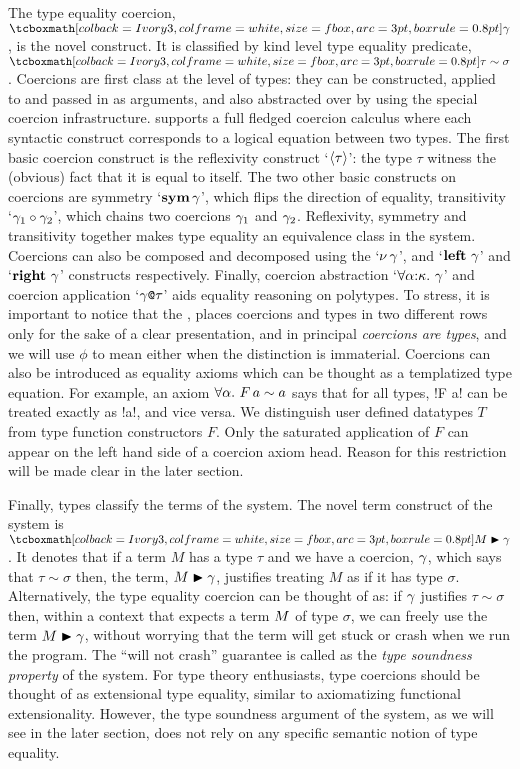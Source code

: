 \documentclass[screen,nonacm]{acmart}
\begin{document}
The type equality coercion, $\shl{\Co}$, is the novel construct.
It is classified by kind level type equality predicate,
$\shl{\tau\sim\sigma}$. Coercions are first class at the level of types:
they can be constructed, applied to and passed in as arguments, and also
abstracted over by using the special coercion infrastructure.
\SFC supports a full fledged coercion calculus where
each syntactic construct corresponds to a logical equation between two
types. The first basic coercion construct is the
reflexivity construct `$\langle{\tau}\rangle$': the type $\tau$
witness the (obvious) fact that it is equal to itself. The two other
basic constructs on coercions are symmetry `$\textbf{sym}\,{\gamma}$', which flips
the direction of equality, transitivity `${\gamma_1} \circ {\gamma_2}$',
which chains two coercions $\gamma_1$ and $\gamma_2$. Reflexivity, symmetry
and transitivity together makes type equality an equivalence class in the
system. Coercions can also be composed and decomposed using the
`$\nu\,\gamma$', and `$\textbf{left}~\gamma$' and `$\textbf{right}~\gamma$' constructs
respectively. Finally, coercion abstraction `$\forall\alpha{:}\kappa.~\gamma$' and coercion application `$\gamma\texttt{@}\tau$' aids
equality reasoning on polytypes. To stress, it is important to notice
that the , places coercions and types in two
different rows only for the sake of a clear presentation, and in
principal \emph{coercions are types}, and we will use $\phi$ to mean
either when the distinction is immaterial. Coercions can also
be introduced as equality axioms which can be thought as a templatized type
equation. For example, an axiom $\forall\alpha.~F\, a \sim a$
says that for all types, !F a! can be treated exactly as !a!, and vice
versa. We distinguish user defined datatypes $T$ from type function constructors
$F$. Only the saturated application of $F$ can appear on the left hand
side of a coercion axiom head. Reason for this restriction will be
made clear in the later section.

Finally, types classify the terms of the system.
The novel term construct of the system is $\shl{\Cast \Tm \Co}$.
It denotes that if a term $M$ has a type $\tau$
and we have a coercion, $\gamma$, which says that $\tau\sim\sigma$
then, the term, $M\mathrel{\blacktriangleright}\gamma$, justifies treating $M$ as if it has type
$\sigma$. Alternatively, the type equality coercion can be thought of
as: if $\gamma$ justifies $\tau \sim \sigma$ then, within a context that
expects a term $M$ of type $\sigma$, we can freely use the term $M\mathrel{\blacktriangleright}\gamma$,
without worrying that the term will get stuck or crash when we run the
program. The ``will not crash'' guarantee is called as the \emph{type
  soundness property} of the system.
For type theory enthusiasts, type coercions should be
thought of as extensional type equality, similar to axiomatizing functional
extensionality. However, the type soundness argument of the system, as we
will see in the later section, does not rely on any specific
semantic notion of type equality.
\end{document}
